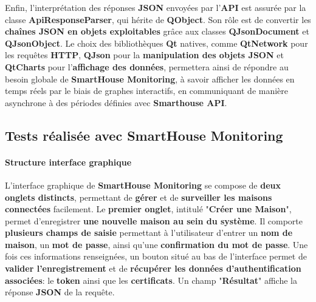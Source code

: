 \documentclass[10pt, a4paper]{report}
\begin{document}
	Enfin, l’interprétation des réponses \textbf{JSON} envoyées par l’\textbf{API} est assurée par la classe \textbf{ApiResponseParser}, qui hérite de \textbf{QObject}. Son rôle est de convertir les \textbf{chaînes JSON en objets exploitables} grâce aux classes \textbf{QJsonDocument} et \textbf{QJsonObject}. Le choix des bibliothèques \textbf{Qt} natives, comme \textbf{QtNetwork} pour les requêtes \textbf{HTTP}, \textbf{QJson} pour la \textbf{manipulation des objets JSON} et \textbf{QtCharts} pour l’\textbf{affichage des données}, permettera ainsi de répondre au besoin globale de \textbf{SmartHouse Monitoring}, à savoir afficher les données en temps réels par le biais de graphes interactifs, en communiquant de manière asynchrone à des périodes définies avec \textbf{Smarthouse API}.\\

	\subsection{Tests réalisée avec SmartHouse Monitoring}
	\paragraph{Structure interface graphique\\}	
	L'interface graphique de \textbf{SmartHouse Monitoring} se compose de \textbf{deux onglets distincts}, permettant de \textbf{gérer} et de \textbf{surveiller les maisons connectées} facilement. Le \textbf{premier onglet}, intitulé "\textbf{Créer une Maison}", permet d'enregistrer \textbf{une nouvelle maison au sein du système}. Il comporte \textbf{plusieurs champs de saisie} permettant à l’utilisateur d’entrer un\textbf{ nom de maison}, un \textbf{mot de passe}, ainsi qu’une \textbf{confirmation du mot de passe}. Une fois ces informations renseignées, un bouton situé au bas de l’interface permet de \textbf{valider l’enregistrement} et de \textbf{récupérer les données d’authentification associées}:  le \textbf{token} ainsi que les \textbf{certificats}.
	 Un champ "\textbf{Résultat}" affiche la réponse \textbf{JSON} de la requête.\\
	
\end{document}

